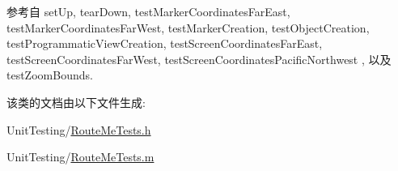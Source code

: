 参考自 set\-Up, tear\-Down, test\-Marker\-Coordinates\-Far\-East, test\-Marker\-Coordinates\-Far\-West, test\-Marker\-Creation, test\-Object\-Creation, test\-Programmatic\-View\-Creation, test\-Screen\-Coordinates\-Far\-East, test\-Screen\-Coordinates\-Far\-West, test\-Screen\-Coordinates\-Pacific\-Northwest , 以及 test\-Zoom\-Bounds.



该类的文档由以下文件生成\-:\begin{DoxyCompactItemize}
\item 
Unit\-Testing/\hyperlink{_route_me_tests_8h}{Route\-Me\-Tests.\-h}\item 
Unit\-Testing/\hyperlink{_route_me_tests_8m}{Route\-Me\-Tests.\-m}\end{DoxyCompactItemize}

